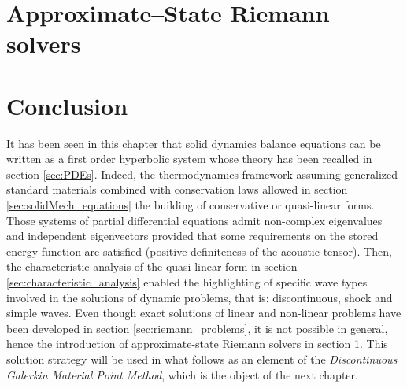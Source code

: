 \section{Approximate--State Riemann solvers}
\label{sec:riemann_solvers}


\section{Conclusion}
It has been seen in this chapter that solid dynamics balance equations can be written as a first order hyperbolic system whose theory has been recalled in section \ref{sec:PDEs}.
Indeed, the thermodynamics framework assuming generalized standard materials combined with conservation laws allowed in section \ref{sec:solidMech_equations} the building of conservative or quasi-linear forms.
Those systems of partial differential equations admit non-complex eigenvalues and independent eigenvectors provided that some requirements on the stored energy function are satisfied (positive definiteness of the acoustic tensor).
Then, the characteristic analysis of the quasi-linear form in section \ref{sec:characteristic_analysis} enabled the highlighting of specific wave types involved in the solutions of dynamic problems, that is: discontinuous, shock and simple waves.
Even though exact solutions of linear and non-linear problems have been developed in section \ref{sec:riemann_problems}, it is not possible in general, hence the introduction of approximate-state Riemann solvers in section \ref{sec:riemann_solvers}.
This solution strategy will be used in what follows as an element of the \textit{Discontinuous Galerkin Material Point Method}, which is the object of the next chapter.

